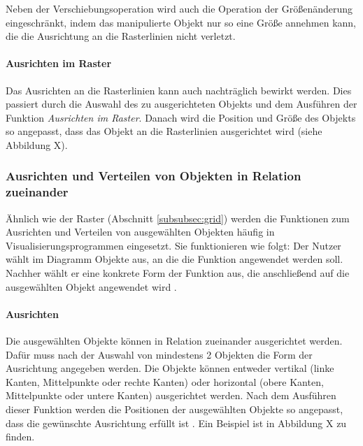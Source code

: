 Neben der Verschiebungsoperation wird auch die Operation der Größenänderung eingeschränkt, indem das manipulierte Objekt nur so eine Größe annehmen kann, die die Ausrichtung an die Rasterlinien nicht verletzt.

\paragraph{Ausrichten im Raster}

Das Ausrichten an die Rasterlinien kann auch nachträglich bewirkt werden. Dies passiert durch die Auswahl des zu ausgerichteten Objekts und dem Ausführen der Funktion \textit{Ausrichten im Raster}. Danach wird die Position und Größe des Objekts so angepasst, dass das Objekt an die Rasterlinien ausgerichtet wird (siehe Abbildung X).  


\subsubsection{Ausrichten und Verteilen von Objekten in Relation zueinander}
\label{subsubsec:alignment-and-distribution}

Ähnlich wie der Raster (Abschnitt \ref{subsubsec:grid}) werden die Funktionen zum Ausrichten und Verteilen von ausgewählten Objekten häufig in Visualisierungsprogrammen eingesetzt. Sie funktionieren wie folgt: Der Nutzer wählt im Diagramm Objekte aus, an die die Funktion angewendet werden soll. Nachher wählt er eine konkrete Form der Funktion aus, die anschließend auf die ausgewählten Objekt angewendet wird \cite{11Keynote}.

\paragraph{Ausrichten}

Die ausgewählten Objekte können in Relation zueinander ausgerichtet werden. Dafür muss nach der Auswahl von mindestens 2 Objekten die Form der Ausrichtung angegeben werden. Die Objekte können entweder vertikal (linke Kanten, Mittelpunkte oder rechte Kanten) oder horizontal (obere Kanten, Mittelpunkte oder untere Kanten) ausgerichtet werden. Nach dem Ausführen dieser Funktion werden die Positionen der ausgewählten Objekte so angepasst, dass die gewünschte Ausrichtung erfüllt ist \cite{11Keynote, 08OmniGraffle}. Ein Beispiel ist in Abbildung X zu finden.



